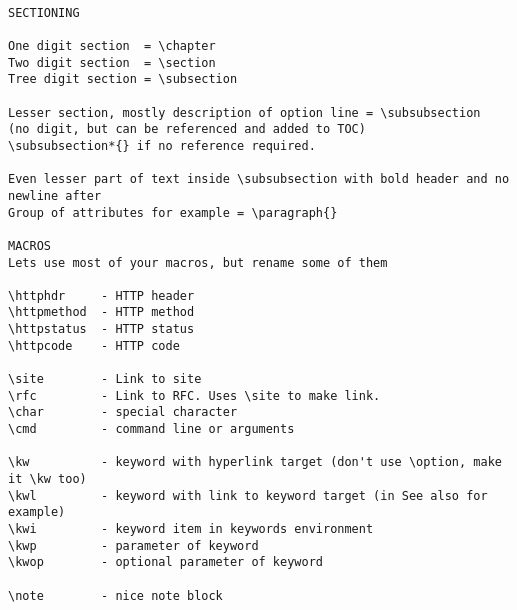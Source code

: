 \begin{verbatim}

SECTIONING

One digit section  = \chapter
Two digit section  = \section
Tree digit section = \subsection

Lesser section, mostly description of option line = \subsubsection
(no digit, but can be referenced and added to TOC)
\subsubsection*{} if no reference required.

Even lesser part of text inside \subsubsection with bold header and no newline after
Group of attributes for example = \paragraph{}

MACROS
Lets use most of your macros, but rename some of them

\httphdr     - HTTP header
\httpmethod  - HTTP method
\httpstatus  - HTTP status
\httpcode    - HTTP code

\site        - Link to site
\rfc         - Link to RFC. Uses \site to make link.
\char        - special character
\cmd         - command line or arguments

\kw          - keyword with hyperlink target (don't use \option, make it \kw too)
\kwl         - keyword with link to keyword target (in See also for example)
\kwi         - keyword item in keywords environment
\kwp         - parameter of keyword
\kwop        - optional parameter of keyword

\note        - nice note block


\end{verbatim}
